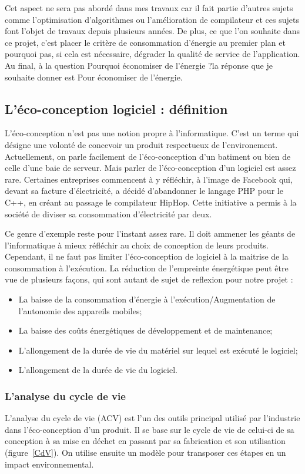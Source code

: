 \documentclass[a4paper, 11pt]{report}
\begin{document}
Cet aspect ne sera pas abordé dans mes travaux car il fait partie d'autres sujets comme l'optimisation d'algorithmes ou l'amélioration de compilateur et  ces sujets font l'objet de travaux depuis plusieurs années. De plus, ce que l'on souhaite dans ce projet, c'est placer le critère de consommation d'énergie au premier plan et pourquoi pas, si cela est nécessaire, dégrader la qualité de service de l'application. Au final, à la question \og Pourquoi économiser de l'énergie ?\fg la réponse que je souhaite donner est \og Pour économiser de l'énergie\fg.
		
		\subsection{L'éco-conception logiciel : définition}
L'éco-conception n'est pas une notion propre à l'informatique. C'est un terme qui désigne une volonté de concevoir un produit respectueux de l'environement. Actuellement, on parle facilement de l'éco-conception d'un batiment ou bien de celle d'une baie de serveur. Mais parler de l'éco-conception d'un logiciel est assez rare. Certaines entreprises commencent à y réfléchir, à l'image de Facebook qui, devant sa facture d'électricité, a décidé d'abandonner le langage PHP pour le C++, en créant au passage le compilateur HipHop. Cette initiative a permis à la société de diviser sa consommation d'électricité par deux.

Ce genre d'exemple reste pour l'instant assez rare. Il doit ammener les géants de l'informatique à mieux réfléchir au choix de conception de leurs produits. Cependant, il ne faut pas limiter l'éco-conception de logiciel à la maitrise de la consommation à l'exécution. La réduction de l’empreinte énergétique peut être vue de plusieurs façons, qui sont autant de sujet de reflexion pour notre projet :
\begin{itemize}
	\item La baisse de la consommation d’énergie à l'exécution/Augmentation de l’autonomie des appareils mobiles;
	\item La baisse des coûts énergétiques de développement et de maintenance;
	\item L'allongement de la durée de vie du matériel sur lequel est exécuté le logiciel;
	\item L'allongement de la durée de vie du logiciel.
\end{itemize}

			\subsubsection{L'analyse du cycle de vie}
L'analyse du cycle de vie (ACV) est l'un des outils principal utilisé par l'industrie dans l'éco-conception d'un produit. Il se base sur le cycle de vie de celui-ci de sa conception à sa mise en déchet en passant par sa fabrication et son utilisation (figure~\ref{CdV}). On utilise ensuite un modèle pour transposer ces étapes en un impact environnemental.
\end{document}
